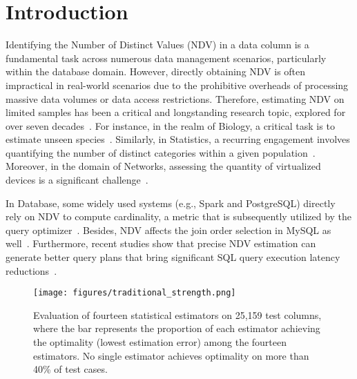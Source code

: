 \section{Introduction}\label{sec:intro}
Identifying the Number of Distinct Values (NDV) in a data column is a fundamental task across numerous data management scenarios, particularly within the database domain. 
However, directly obtaining NDV is often impractical in real-world scenarios due to the prohibitive overheads of processing massive data volumes or data access restrictions.
Therefore, estimating NDV on limited samples has been a critical and longstanding research topic, explored for over seven decades~\cite{goodman1949estimation}. 
For instance, in the realm of Biology, a critical task is to estimate unseen species~\cite{valiant2013estimating,valiant2017estimating,mmo_bunge1993estimating}. 
Similarly, in Statistics, a recurring engagement involves quantifying the number of distinct categories within a given population~\cite{goodman1949estimation,chao1984nonparametric}.
Moreover, in the domain of Networks, assessing the quantity of virtualized devices is a significant challenge~\cite{network_cohen2019cardinality,network_nath2008synopsis}. 

In Database, some widely used systems (e.g., Spark and PostgreSQL) directly rely on NDV to compute cardinality, a metric that is subsequently utilized by the query optimizer~\cite{spark_plan_code,pg_plan_code}. 
Besides, NDV affects the join order selection in MySQL as well~\cite{mysql_join}.
Furthermore, recent studies show that precise NDV estimation can generate better query plans that bring significant SQL query execution latency reductions~\cite{li2023alece,han2024bytecard}.



\begin{figure}
    \centering
    \texttt{[image: figures/traditional\_strength.png]}
    \caption{Evaluation of fourteen statistical estimators on 25,159 test columns, where the bar represents the proportion of each estimator achieving the optimality (lowest estimation error) among the fourteen estimators. No single estimator achieves optimality on more than 40\% of test cases.}
    \label{fig:traditional-strength}
\end{figure}


